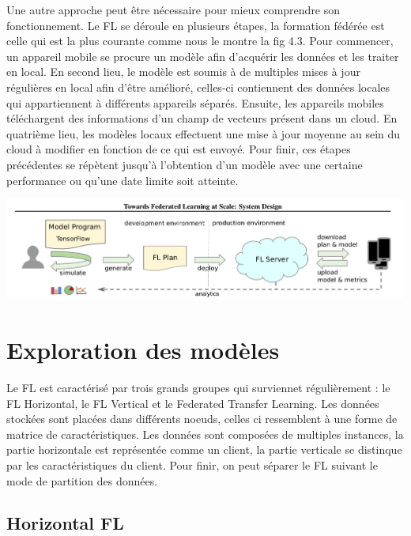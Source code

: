 \documentclass[12pt,a4paper,french]{report}
\begin{document}
\pagebreak

Une autre approche peut être nécessaire pour mieux comprendre son fonctionnement. Le FL se déroule en plusieurs étapes, la formation fédérée est celle qui est la plus courante comme nous le montre la fig 4.3. Pour commencer, un appareil mobile se procure un modèle afin d'acquérir les données et les traiter en local. En second lieu, le modèle est soumis à de multiples mises à jour régulières en local afin d'être amélioré, celles-ci contiennent des données locales qui appartiennent à différents appareils séparés. Ensuite, les appareils mobiles téléchargent des informations d'un champ de vecteurs présent dans un cloud. En quatrième lieu, les modèles locaux effectuent une mise à jour moyenne au sein du cloud à modifier en fonction de ce qui est envoyé. Pour finir, ces étapes précédentes se répètent jusqu'à l'obtention d'un modèle avec une certaine performance ou qu'une date limite soit atteinte.

\begin{center}
	\includegraphics[scale=0.3]{mobile_schema_fl}
	\label{fig1}
\end{center}

\section{Exploration des modèles}

Le FL est caractérisé par trois grands groupes qui surviennet régulièrement : le FL Horizontal, le FL Vertical et le Federated Transfer Learning. Les données stockées sont placées dans différents noeuds, celles ci ressemblent à une forme de matrice de caractéristiques. Les données sont composées de multiples instances, la partie horizontale est représentée comme un client, la partie verticale se distinque par les caractéristiques du client. Pour finir, on peut séparer le FL suivant le mode de partition des données.\\

\subsection{Horizontal FL}
\end{document}
